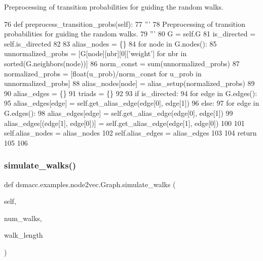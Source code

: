 \begin{DoxyVerb}Preprocessing of transition probabilities for guiding the random walks.
\end{DoxyVerb}
 
\begin{DoxyCode}
76     \textcolor{keyword}{def }preprocess\_transition\_probs(self):
77         \textcolor{stringliteral}{'''}
78 \textcolor{stringliteral}{        Preprocessing of transition probabilities for guiding the random walks.}
79 \textcolor{stringliteral}{        '''}
80         G = self.G
81         is\_directed = self.is\_directed
82 
83         alias\_nodes = \{\}
84         \textcolor{keywordflow}{for} node \textcolor{keywordflow}{in} G.nodes():
85             unnormalized\_probs = [G[node][nbr][0][\textcolor{stringliteral}{'weight'}] \textcolor{keywordflow}{for} nbr \textcolor{keywordflow}{in} sorted(G.neighbors(node))]
86             norm\_const = sum(unnormalized\_probs)
87             normalized\_probs =  [float(u\_prob)/norm\_const \textcolor{keywordflow}{for} u\_prob \textcolor{keywordflow}{in} unnormalized\_probs]
88             alias\_nodes[node] = alias\_setup(normalized\_probs)
89 
90         alias\_edges = \{\}
91         triads = \{\}
92 
93         \textcolor{keywordflow}{if} is\_directed:
94             \textcolor{keywordflow}{for} edge \textcolor{keywordflow}{in} G.edges():
95                 alias\_edges[edge] = self.get\_alias\_edge(edge[0], edge[1])
96         \textcolor{keywordflow}{else}:
97             \textcolor{keywordflow}{for} edge \textcolor{keywordflow}{in} G.edges():
98                 alias\_edges[edge] = self.get\_alias\_edge(edge[0], edge[1])
99                 alias\_edges[(edge[1], edge[0])] = self.get\_alias\_edge(edge[1], edge[0])
100 
101         self.alias\_nodes = alias\_nodes
102         self.alias\_edges = alias\_edges
103 
104         \textcolor{keywordflow}{return}
105 
106 
\end{DoxyCode}
\mbox{\label{classdsmacc_1_1examples_1_1node2vec_1_1Graph_a71bea4409cd123157c0d7edfd2efcd36}} 
\subsubsection{\texorpdfstring{simulate\+\_\+walks()}{simulate\_walks()}}
{\footnotesize\ttfamily def dsmacc.\+examples.\+node2vec.\+Graph.\+simulate\+\_\+walks (\begin{DoxyParamCaption}\item[{}]{self,  }\item[{}]{num\+\_\+walks,  }\item[{}]{walk\+\_\+length }\end{DoxyParamCaption})}

